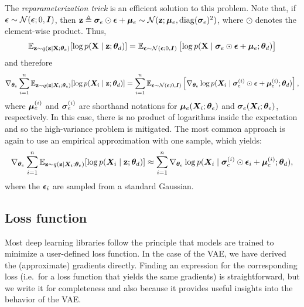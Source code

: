 The \emph{reparameterization trick} is an efficient solution to this problem. Note that, if ${\bm{\epsilon}} \sim \mathcal{N}({\bm{\epsilon}}; 0, {\bm{I}})$, then ${\mathbf{z}} \triangleq {\bm{\sigma}}_e \odot {\bm{\epsilon}} + {\bm{\mu}}_e \sim  \mathcal{N}({\mathbf{z}}; {\bm{\mu}}_e, \mathrm{diag}({\bm{\sigma}}_e)^2)$, where $\odot$ denotes the element-wise product. Thus,
\begin{equation}
    \mathbb{E}_{{\mathbf{z}} \sim q({\mathbf{z}} \mid {\mathbf{X}}; {\bm{\theta}}_e)} [\log p({\mathbf{X}} \mid {\mathbf{z}}; {\bm{\theta}}_d)] = \mathbb{E}_{{\bm{\epsilon}} \sim \mathcal{N}({\bm{\epsilon}}; 0, {\bm{I}})} \left[\log p({\mathbf{X}} \mid {\bm{\sigma}}_e \odot {\bm{\epsilon}} + {\bm{\mu}}_e; {\bm{\theta}}_d) \right]
\end{equation}
and therefore
\begin{equation}
    \nabla_{{\bm{\theta}}_e} \sum_{i=1}^n \mathbb{E}_{{\mathbf{z}} \sim q({\mathbf{z}} \mid {\bm{X}}_i; {\bm{\theta}}_e)} [\log p({\bm{X}}_i \mid {\mathbf{z}}; {\bm{\theta}}_d) ] = \sum_{i=1}^n \mathbb{E}_{{\bm{\epsilon}} \sim \mathcal{N}({\bm{\epsilon}}; 0, {\bm{I}})} \left[\nabla_{{\bm{\theta}}_e} \log p({\bm{X}}_i \mid {\bm{\sigma}}_e^{(i)} \odot {\bm{\epsilon}} + {\bm{\mu}}_e^{(i)}; {\bm{\theta}}_d)\right],
\end{equation}
where ${\bm{\mu}}_e^{(i)}$ and ${\bm{\sigma}}_e^{(i)}$ are shorthand notations for ${\bm{\mu}}_e({\bm{X}}_i; {\bm{\theta}}_e)$ and ${\bm{\sigma}}_e({\bm{X}}_i; {\bm{\theta}}_e)$, respectively. In this case, there is no product of logarithms inside the expectation and so the high-variance problem is mitigated. The most common approach is again to use an empirical approximation with one sample, which yields:
\begin{equation}
    \label{eq:vae_likelihood_encoder_grad}
    \nabla_{{\bm{\theta}}_e} \sum_{i=1}^n \mathbb{E}_{{\mathbf{z}} \sim q({\mathbf{z}} \mid {\bm{X}}_i; {\bm{\theta}}_e)} [\log p({\bm{X}}_i \mid {\mathbf{z}}; {\bm{\theta}}_d) ] \approx \sum_{i=1}^n \nabla_{{\bm{\theta}}_e} \log p({\bm{X}}_i \mid {\bm{\sigma}}_e^{(i)} \odot {\bm{\epsilon}}_i + {\bm{\mu}}_e^{(i)}; {\bm{\theta}}_d),
\end{equation}
where the ${\bm{\epsilon}}_i$ are sampled from a standard Gaussian.

\subsection{Loss function}
Most deep learning libraries follow the principle that models are trained to minimize a user-defined loss function. In the case of the VAE, we have derived the (approximate) gradients directly. Finding an expression for the corresponding loss (i.e.\ for a loss function that yields the same gradients) is straightforward, but we write it for completeness and also because it provides useful insights into the behavior of the VAE.

